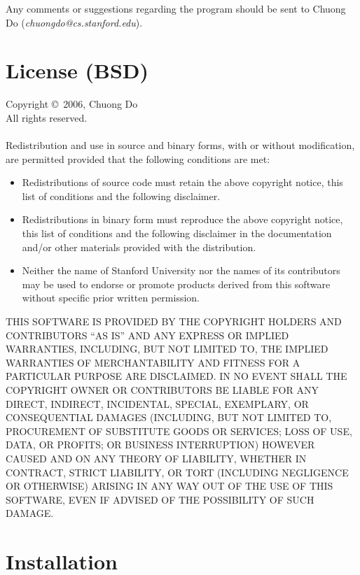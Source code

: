 \documentclass{article}
\begin{document}
  Any comments or suggestions regarding the program should be sent 
  to Chuong Do (\emph{chuongdo@cs.stanford.edu}).  
  
  \newpage
  \section{License (BSD)}

  \noindent
  Copyright \copyright\ 2006, Chuong Do \\
  All rights reserved.\\
  \\
  Redistribution and use in source and binary forms, with or without
  modification, are permitted provided that the following conditions are
  met:
  
  \begin{itemize}
  \item 
    Redistributions of source code must retain the above copyright
    notice, this list of conditions and the following disclaimer.
  \item
    Redistributions in binary form must reproduce the above
    copyright notice, this list of conditions and the following disclaimer
    in the documentation and/or other materials provided with the
    distribution.
  \item
    Neither the name of Stanford University nor the names of its
    contributors may be used to endorse or promote products derived from
    this software without specific prior written permission.
  \end{itemize}

  \noindent
  THIS SOFTWARE IS PROVIDED BY THE COPYRIGHT HOLDERS AND CONTRIBUTORS
  ``AS IS'' AND ANY EXPRESS OR IMPLIED WARRANTIES, INCLUDING, BUT NOT
  LIMITED TO, THE IMPLIED WARRANTIES OF MERCHANTABILITY AND FITNESS FOR
  A PARTICULAR PURPOSE ARE DISCLAIMED. IN NO EVENT SHALL THE COPYRIGHT
  OWNER OR CONTRIBUTORS BE LIABLE FOR ANY DIRECT, INDIRECT, INCIDENTAL,
  SPECIAL, EXEMPLARY, OR CONSEQUENTIAL DAMAGES (INCLUDING, BUT NOT
  LIMITED TO, PROCUREMENT OF SUBSTITUTE GOODS OR SERVICES; LOSS OF USE,
  DATA, OR PROFITS; OR BUSINESS INTERRUPTION) HOWEVER CAUSED AND ON ANY
  THEORY OF LIABILITY, WHETHER IN CONTRACT, STRICT LIABILITY, OR TORT
  (INCLUDING NEGLIGENCE OR OTHERWISE) ARISING IN ANY WAY OUT OF THE USE
  OF THIS SOFTWARE, EVEN IF ADVISED OF THE POSSIBILITY OF SUCH DAMAGE.

  \newpage
  \section{Installation}
\end{document}
